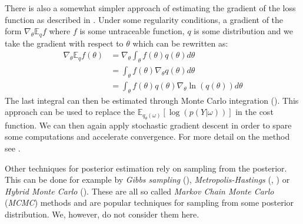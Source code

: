 \documentclass[12pt,a4paper,twoside]{scrartcl}
\numberwithin{equation}{section}
\begin{document}
There is also a somewhat simpler approach of estimating the gradient of the loss function as described in \cite{paisley2012}. Under some regularity conditions, a gradient of the form \(\nabla_{\theta}\mathbb{E}_qf \) where \(f \) is some untraceable function, \(q\) is some distribution and we take the gradient with respect to \(\theta\) which can be rewritten as:
\begin{align}
  \nabla_{\theta}\mathbb{E}_qf(\theta) &= \nabla_{\theta}\int_{\theta} f(\theta)q(\theta)d\theta \\
                                       &= \int_{\theta} f(\theta) \nabla_{\theta}q(\theta)d\theta \\
                                       &= \int_{\theta} f(\theta)q(\theta) \nabla_{\theta}\ln(q(\theta)) d\theta
\end{align}
The last integral can then be estimated through Monte Carlo integration (\cite{hammersley1964}). This approach can be used to replace the \(\mathbb{E}_{q_{\theta}(\omega)}[\log(p(Y|\omega))]\) in the cost function. We can then again apply stochastic gradient descent in order to spare some computations and accelerate convergence. For more detail on the method see \cite{paisley2012}.

Other techniques for posterior estimation rely on sampling from the posterior. This can be done for example by \emph{Gibbs sampling} (\cite{geman1984}), \emph{Metropolis-Hastings} (\cite{metropolis1953}, \cite{hastings1970}) or \emph{Hybrid Monte Carlo} (\cite{duane1987}). These are all so called \emph{Markov Chain Monte Carlo} (\emph{MCMC}) methods and are popular techniques for sampling from some posterior distribution. We, however, do not consider them here.
\end{document}
